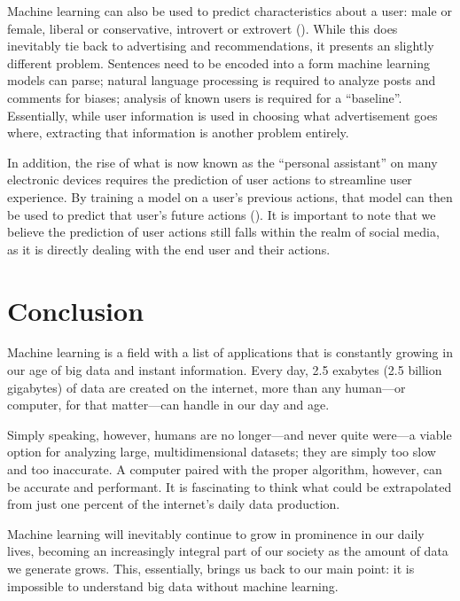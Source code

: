 \documentclass[a4paper]{comjnl}
\numberwithin{equation}{subsection}
\begin{document}
        Machine learning can also be used to predict characteristics about a user: male or female,
        liberal or conservative, introvert or extrovert (\cite{pennacchiottim}). While this does
        inevitably tie back to advertising and recommendations, it presents an slightly different
        problem. Sentences need to be encoded into a form machine learning models can parse; natural
        language processing is required to analyze posts and comments for biases; analysis of known
        users is required for a ``baseline''. Essentially, while user information is used in
        choosing what advertisement goes where, extracting that information is another problem
        entirely.

        In addition, the rise of what is now known as the ``personal assistant'' on many electronic
        devices requires the prediction of user actions to streamline user experience. By training
        a model on a user's previous actions, that model can then be used to predict that user's
        future actions (\cite{stuartl}). It is important to note that we believe the prediction of
        user actions still falls within the realm of social media, as it is directly dealing with
        the end user and their actions.


    \section{Conclusion}\label{sec:concl}

        Machine learning is a field with a list of applications that is constantly growing in our
        age of big data and instant information. Every day, 2.5 exabytes (2.5 billion gigabytes) of
        data are created on the internet, more than any human---or computer, for that matter---can
        handle in our day and age.

        Simply speaking, however, humans are no longer---and never quite were---a viable option for
        analyzing large, multidimensional datasets; they are simply too slow and too inaccurate. A
        computer paired with the proper algorithm, however, can be accurate and performant. It is
        fascinating to think what could be extrapolated from just one percent of the internet's
        daily data production.

        Machine learning will inevitably continue to grow in prominence in our daily lives, becoming
        an increasingly integral part of our society as the amount of data we generate grows. This,
        essentially, brings us back to our main point: it is impossible to understand big data
        without machine learning.


    \nocite{*}
    \printbibliography
\end{document}
